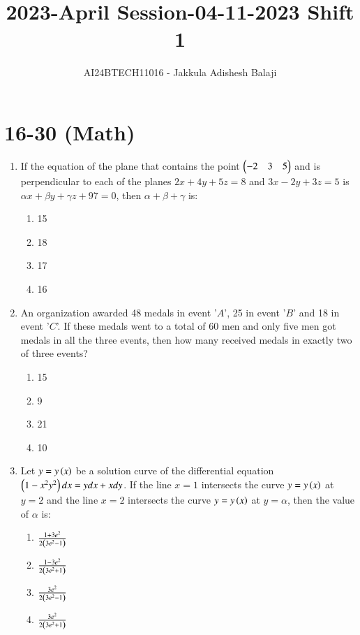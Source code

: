 \documentclass[journal]{IEEEtran}
\begin{document}

\title{2023-April Session-04-11-2023 Shift 1}
\author{AI24BTECH11016 - Jakkula Adishesh Balaji}
{\let\newpage\relax\maketitle}

\renewcommand{\thefigure}{\theenumi}
\renewcommand{\thetable}{\theenumi}
\setlength{\intextsep}{10pt} %

\section{16-30 (Math)}
\begin{enumerate}
	\item
	If the equation of the plane that contains the point $\begin{pmatrix}-2 & 3 & 5\end{pmatrix}$ and is perpendicular to each of the planes $2x + 4y + 5z = 8$ and $3x - 2y + 3z = 5$ is $\alpha x + \beta y + \gamma z + 97 = 0$, then $\alpha + \beta + \gamma$ is:
		\begin{enumerate}
			\item 15
			\item 18
			\item 17
			\item 16
		\end{enumerate}

	\item
	An organization awarded 48 medals in event '$A$', 25 in event '$B$' and 18 in event '$C$'. If these medals went to a total of 60 men and only five men got medals in all the three events, then how many received medals in exactly two of three events?
		\begin{enumerate}
			\item 15
			\item 9
			\item 21
			\item 10
		\end{enumerate}

	\item
	Let $y = y\left(x\right)$ be a solution curve of the differential equation $\left(1 - x^{2}y^{2}\right)dx = y dx + x dy$. If the line $x = 1$ intersects the curve $y = y\left(x\right)$ at $y = 2$ and the line $x = 2$ intersects the curve $y = y\left(x\right)$ at $y = \alpha$, then the value of $\alpha$ is:
		\begin{enumerate}
			\item $\frac{1+3e^{2}}{2\left(3e^{2}-1\right)}$
			\item $\frac{1-3e^{2}}{2\left(3e^{2}+1\right)}$
			\item $\frac{3e^{2}}{2\left(3e^{2}-1\right)}$
			\item $\frac{3e^{2}}{2\left(3e^{2}+1\right)}$
		\end{enumerate}


\end{enumerate}
\end{document}
